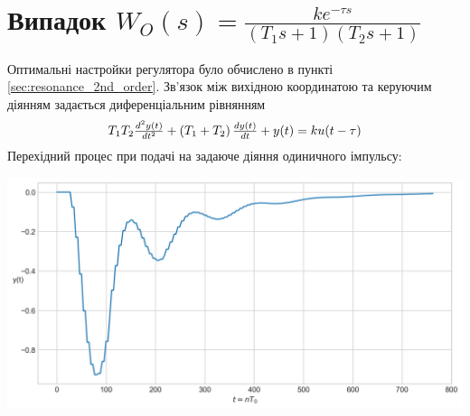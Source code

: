 \section{Випадок 
\texorpdfstring{$W_O(s) = \frac{ k e^{-\tau s}}{(T_1 s + 1) (T_2 s + 1)}$}{1}}
Оптимальні настройки регулятора було обчислено в пункті \ref{sec:resonance_2nd_order}.
Зв'язок між вихідною координатою та керуючим діянням задається диференціальним рівнянням
\begin{gather*}
    \mbox{\normalsize 
    $T_1 T_2 \frac{d^2 y(t)}{dt^2} +
    \left(T_1 + T_2 \right) \frac{d y(t)}{dt} + y(t) = k u(t-\tau)$}
\end{gather*}
Перехідний процес при подачі на задаюче діяння одиничного імпульсу:
\begin{center}
    \includegraphics[width=\textwidth]{pics/transient_process_final_9_2_impulse.png}
\end{center}

